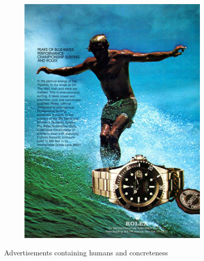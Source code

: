 \begin{figure}
\begin{subfigure}[b]{0.3\textwidth}
     \end{subfigure}
     \begin{subfigure}[b]{0.3\textwidth}
         \centering
         \includegraphics[width=\textwidth,scale=1.0]{images/humans_concreteness_img3.pdf}
         \caption{}
         
     \end{subfigure}
    \caption{Advertisements containing humans and concreteness}
    \label{fig:humans_concreteness-ads}
\end{figure}




